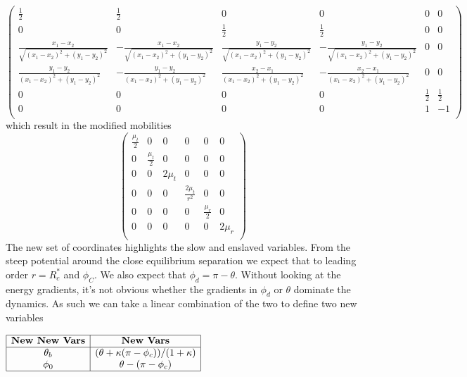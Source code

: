 {$\left(
\begin{array}{cccccc}
 \frac{1}{2} & \frac{1}{2} & 0 & 0 & 0 & 0 \\
 0 & 0 & \frac{1}{2} & \frac{1}{2} & 0 & 0 \\
 \frac{x_1-x_2}{\sqrt{(x_1-x_2)^2+(y_1-y_2)^2}} & -\frac{x_1-x_2}{\sqrt{(x_1-x_2)^2+(y_1-y_2)^2}} & \frac{y_1-y_2}{\sqrt{(x_1-x_2)^2+(y_1-y_2)^2}} & -\frac{y_1-y_2}{\sqrt{(x_1-x_2)^2+(y_1-y_2)^2}} & 0 & 0 \\
 \frac{y_1-y_2}{(x_1-x_2)^2+(y_1-y_2)^2} & -\frac{y_1-y_2}{(x_1-x_2)^2+(y_1-y_2)^2} & \frac{x_2-x_1}{(x_1-x_2)^2+(y_1-y_2)^2} & -\frac{x_2-x_1}{(x_1-x_2)^2+(y_1-y_2)^2} & 0 & 0 \\
 0 & 0 & 0 & 0 & \frac{1}{2} & \frac{1}{2} \\
 0 & 0 & 0 & 0 & 1 & -1 \\
\end{array}
\right)$
which result in the modified mobilities
\begin{equation}
    \left(
\begin{array}{cccccc}
 \frac{\mu_t}{2} & 0 & 0 & 0 & 0 & 0 \\
 0 & \frac{\mu_t}{2} & 0 & 0 & 0 & 0 \\
 0 & 0 & 2 \mu_t & 0 & 0 & 0 \\
 0 & 0 & 0 & \frac{2 \mu_t}{r^2} & 0 & 0 \\
 0 & 0 & 0 & 0 & \frac{\mu_r}{2} & 0 \\
 0 & 0 & 0 & 0 & 0 & 2 \mu_r \\
\end{array}
\right)
\end{equation}
The new set of coordinates highlights the slow and enslaved variables. From the steep potential around the close equilibrium separation we expect that to leading order $r=R^*_c$ and $\phi_C$. We also expect that $\phi_d = \pi - \theta$. Without looking at the energy gradients, it's not obvious whether the gradients in $\phi_d$ or $\theta$ dominate the dynamics. As such we can take a linear combination of the two to define two new variables
\begin{center}
$\begin{array}{ |c|c| }
\hline
\textbf{New New  Vars} & \textbf{New Vars} \\
\hline
\theta_b & (\theta + \kappa (\pi - \phi_c))/(1+\kappa) \\
\phi_0 & \theta - (\pi - \phi_c) \\
\hline
\end{array}$
\end{center}
}
